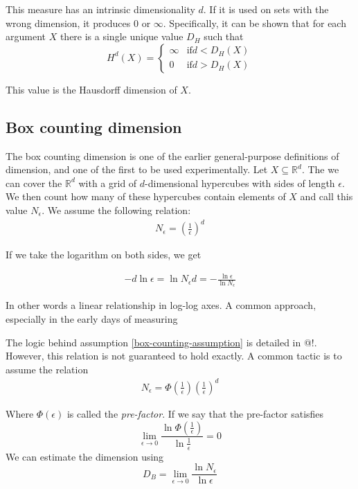 \documentclass[10pt]{article}
\begin{document}
This measure has an intrinsic dimensionality $d$. If it is used on sets with the wrong dimension, it produces $0$ or $\infty$. Specifically, it can be shown that for each argument $X$ there is a single unique value $D_H$ such that 
\[
H^d(X) = \left \{ 
\begin{array}{rl}
  \infty &\mbox{if} d < D_H(X) \\
  0 &\mbox{if} d > D_H(X)
\end{array} \right.
\]

This value is the Hausdorff dimension of $X$.

\subsection{Box counting dimension}

The box counting dimension is one of the earlier general-purpose definitions of dimension, and one of the first to be used experimentally. Let $X \subseteq {\mathbb R}^d$. The we can cover the ${\mathbb R}^d$ with a grid of $d$-dimensional hypercubes with sides of length $\epsilon$. We then count how many of these hypercubes contain elements of $X$ and call this value $N_\epsilon$. We assume the following relation:
\begin{align}
\label{box-counting-assumption}
N_\epsilon = \left (\frac{1}{\epsilon}\right) ^ d
\end{align}

If we take the logarithm on both sides, we get

\begin{align*}
 - d \ln \epsilon = \ln N_\epsilon
 d = - \frac{\ln \epsilon}{\ln N_\epsilon}
\end{align*}

In other words a linear relationship in log-log axes. A common approach, especially in the early days of measuring 

The logic behind assumption \ref{box-counting-assumption} is detailed in @!. However, this relation is not guaranteed to hold exactly. A common tactic is to assume the relation 
\begin{align}
N_\epsilon = \Phi(\frac{1}{\epsilon})\left (\frac{1}{\epsilon}\right) ^ d
\end{align}

Where $\Phi\left(\epsilon\right)$ is called the \textit{pre-factor}. If we say that the pre-factor satisfies
\[
\lim_{\epsilon \rightarrow 0} \frac{\ln \Phi(\frac{1}{\epsilon})}{\ln \frac{1}{\epsilon}} = 0
\]
We can estimate the dimension using 
\[
D_B = \lim_{\epsilon \rightarrow 0} \frac{\ln N_\epsilon}{ \ln \epsilon}
\]
\end{document}
